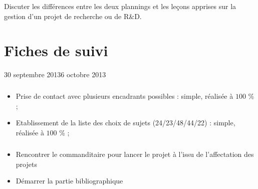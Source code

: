 \documentclass[11pt, french]{report-rd-info}
\begin{document}
Discuter les différences entre les deux plannings et les leçons apprises sur la gestion d'un projet de recherche ou de R\&D.

\chapter{Fiches de suivi}
\label{ann:FichesSuivi}

\begin{fichesuivi}{30 septembre 2013}{6 octobre 2013}

\paragraph{}
	\begin{travaileffectue}
		\begin{itemize}
			\item Prise de contact avec plusieurs encadrants possibles : simple, réalisée à $100$ \% ;
			\item Etablissement de la liste des choix de sujets (24/23/48/44/22) : simple, réalisée à $100$ \% ;		
		\end{itemize}
	\end{travaileffectue}
	
\paragraph{}
	\begin{planification}
		\begin{itemize}
			\item Rencontrer le commanditaire pour lancer le projet à l'issu de l'affectation des projets
			\item Démarrer la partie bibliographique
		\end{itemize}
	\end{planification}
\end{fichesuivi}
\end{document}
